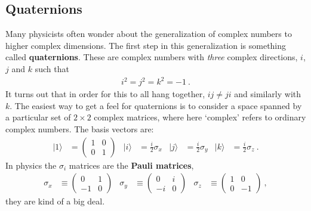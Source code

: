 \documentclass[12pt]{article}
\numberwithin{equation}{section}    %
\begin{document}
\subsection{Quaternions}

Many physicists often wonder about the generalization of complex numbers to higher complex dimensions. The first step in this generalization is something called \textbf{quaternions}. These are complex numbers with \emph{three} complex directions, $i$, $j$ and $k$ such that
\begin{align}
	i^2 = j^2 = k^2 = -1 \ .
	\label{eq:ijk:m1}
\end{align}
It turns out that in order for this to all hang together, $ij \neq ji$ and similarly with $k$. The easiest way to get a feel for quaternions is to consider a space spanned by a particular set of $2\times 2$ complex matrices, where here `complex' refers to ordinary complex numbers. The basis vectors are:
\begin{align}
	|1\rangle &=
	\begin{pmatrix}
		1 & 0 \\ 0 & 1
	\end{pmatrix}
	&
	|i\rangle &=
	\frac{i}{2}\sigma_x
	&
	|j\rangle &=
	\frac{i}{2}\sigma_y
	&
	|k\rangle &=
	\frac{i}{2}\sigma_z
	\ .
\end{align}
In physics the $\sigma_i$ matrices are the \textbf{Pauli matrices},
\begin{align}
\sigma_x&\equiv
	\begin{pmatrix}
		0 & 1 \\ -1 & 0
	\end{pmatrix}
	&
	\sigma_y
	&\equiv
	\begin{pmatrix}
		0 & i \\ -i & 0
	\end{pmatrix}
	&
	\sigma_z
	&\equiv
	\begin{pmatrix}
		1 & 0 \\ 0 & -1
	\end{pmatrix} \ ,
	\label{eq:Pauli}
\end{align}
they are kind of a big deal.
\end{document}
